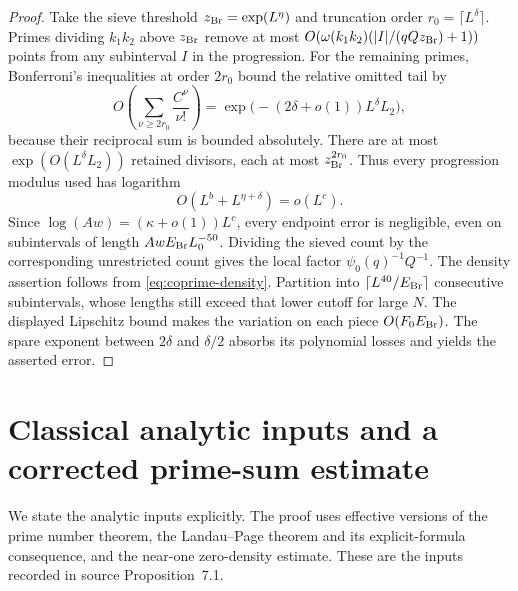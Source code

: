 \begin{proof}
Take the sieve threshold \(z_{\rm Br}=\exp(L^\eta)\) and truncation
order \(r_0=\lceil L^\delta\rceil\).  Primes dividing \(k_1k_2\)
above \(z_{\rm Br}\) remove at most
\(O(\omega(k_1k_2)(|I|/(qQz_{\rm Br})+1))\) points from any
subinterval \(I\) in the progression.  For the remaining primes,
Bonferroni's inequalities at order \(2r_0\) bound the relative omitted
tail by
\[
 O\left(\sum_{\nu\ge2r_0}\frac{C^\nu}{\nu!}\right)
 =\exp\bigl(-(2\delta+o(1))L^\delta L_2\bigr),
\]
because their reciprocal sum is bounded absolutely.  There are at most
\(\exp(O(L^\delta L_2))\) retained divisors, each at most
\(z_{\rm Br}^{2r_0}\).  Thus every progression modulus used has
logarithm
\[
 O(L^b+L^{\eta+\delta})=o(L^c).
\]
Since \(\log(Aw)=(\kappa+o(1))L^c\), every endpoint error is
negligible, even on subintervals of length
\(AwE_{\rm Br}L_0^{-50}\).  Dividing the sieved count by the corresponding
unrestricted count gives the local factor \(\psi_0(q)^{-1}Q^{-1}\).
The density assertion follows from \eqref{eq:coprime-density}.
Partition into \(\lceil L^{40}/E_{\rm Br}\rceil\) consecutive
subintervals, whose lengths still exceed that lower cutoff for large
\(N\).  The displayed Lipschitz bound makes the variation on each
piece \(O(F_0E_{\rm Br})\).  The spare exponent between
\(2\delta\) and \(\delta/2\) absorbs its polynomial losses and yields
the asserted error.
\end{proof}

\section{Classical analytic inputs and a corrected prime-sum estimate}
\label{sec:analytic-inputs}

We state the analytic inputs explicitly.  The proof uses effective
versions of the prime number theorem, the Landau--Page theorem and its
explicit-formula consequence, and the near-one zero-density estimate.
These are the inputs recorded in source Proposition~7.1.

